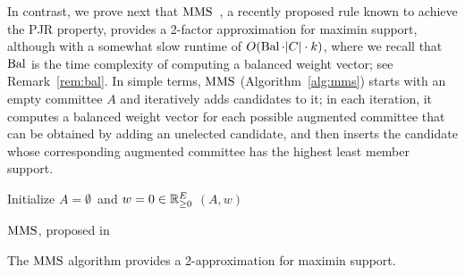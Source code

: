 


In contrast, we prove next that $\operatorname{MMS}$~\cite{sanchez2016maximin}, a recently proposed rule known to achieve the PJR property, provides a 2-factor approximation for maximin support, although with a somewhat slow runtime of $O(\operatorname{Bal} \cdot |C|\cdot k)$, where we recall that $\operatorname{Bal}$ is the time complexity of computing a balanced weight vector; see Remark~\ref{rem:bal}. In simple terms, $\operatorname{MMS}$ (Algorithm~\ref{alg:mms}) starts with an empty committee $A$ and iteratively adds candidates to it; in each iteration, it computes a balanced weight vector for each possible augmented committee that can be obtained by adding an unelected candidate, and then inserts the candidate whose corresponding augmented committee has the highest least member support.


\begin{algorithm}[htb]\label{alg:mms}
\SetAlgoLined
{}
Initialize $A=\emptyset$\ and $w=0\in \mathbb{R}_{\geq 0}^E$\;
\Return $(A,w)$\;
\caption{$\operatorname{MMS}$, proposed in~\cite{sanchez2016maximin}}
\end{algorithm}

\begin{theorem}\label{thm:mms}
The $\operatorname{MMS}$ algorithm provides a 2-approximation for maximin support.
\end{theorem}

